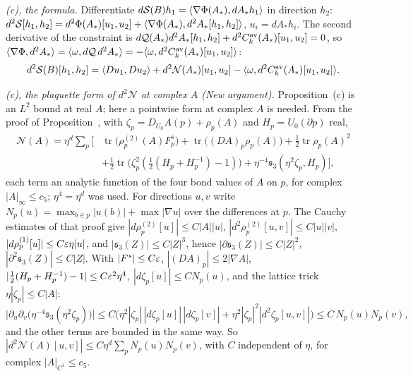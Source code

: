 \begin{detail}
\begin{step}
\end{step}
\begin{step}
\emph{(c), the formula.} Differentiate $d\mathcal S(B)h_1=\langle \nabla\Phi(A_*),dA_*h_1\rangle$ in direction $h_2$: $d^2\mathcal S[h_1,h_2]=d^2\Phi(A_*)[u_1,u_2]+\langle \nabla\Phi(A_*),d^2A_*[h_1,h_2]\rangle$, $u_i=dA_*h_i$. The second derivative of the constraint is $d\mathcal Q(A_*)d^2A_*[h_1,h_2]+d^2C^{\rm av}_k(A_*)[u_1,u_2]=0$, so $\langle \nabla\Phi,d^2A_*\rangle=\langle \omega,d\mathcal Q\,d^2A_*\rangle=-\langle \omega,d^2C^{\rm av}_k(A_*)[u_1,u_2]\rangle$:
\[
d^2\mathcal S(B)[h_1,h_2]=\langle Du_1,Du_2\rangle+d^2\mathcal N(A_*)[u_1,u_2]-\langle \omega,d^2C^{\rm av}_k(A_*)[u_1,u_2]\rangle .
\]
\end{step}
\begin{step}
\emph{(c), the plaquette form of $d^2\mathcal N$ at complex $A$ (New argument).} Proposition~(c) is an $L^2$ bound at real $A$; here a pointwise form at complex $A$ is needed. From the proof of Proposition~, with $\zeta_p=D_{U_0}A(p)+\rho_p(A)$ and $H_p=U_0(\partial p)$ real,
\[
\begin{aligned}
\mathcal N(A)=\eta^d\sum_p\Big[&\operatorname{tr}\big(\rho^{(2)}_p(A)F^s_p\big)+\operatorname{tr}\big((DA)_p\rho_p(A)\big)+\tfrac12\operatorname{tr}\rho_p(A)^2\\
&+\tfrac12\operatorname{tr}\big(\zeta_p^2(\tfrac12(H_p+H_p^{-1})-1)\big)+\eta^{-4}\mathfrak s_3(\eta^2\zeta_p,H_p)\Big],
\end{aligned}
\]
each term an analytic function of the four bond values of $A$ on $p$, for complex $|A|_\infty\le c_5$; $\eta^4=\eta^d$ was used. For directions $u,v$ write $N_p(u)=\max_{b\in p}|u(b)|+\max|\nabla u|$ over the differences at $p$. The Cauchy estimates of that proof give $|d\rho^{(2)}_p[u]|\le C|A||u|$, $|d^2\rho^{(2)}_p[u,v]|\le C|u||v|$, $|d\rho^{(1)}_p[u]|\le C\varepsilon\eta|u|$, and $|\mathfrak s_3(Z)|\le C|Z|^3$, hence $|\partial\mathfrak s_3(Z)|\le C|Z|^2$, $|\partial^2\mathfrak s_3(Z)|\le C|Z|$. With $|F^s|\le C\varepsilon$, $|(DA)_p|\le2|\nabla A|$, $|\tfrac12(H_p+H_p^{-1})-1|\le C\varepsilon^2\eta^4$, $|d\zeta_p[u]|\le CN_p(u)$, and the lattice trick $\eta|\zeta_p|\le C|A|$:
\[
\big|\partial_u\partial_v\big(\eta^{-4}\mathfrak s_3(\eta^2\zeta_p)\big)\big|\le C\big(\eta^2|\zeta_p|\,|d\zeta_p[u]|\,|d\zeta_p[v]|+\eta^2|\zeta_p|^2|d^2\zeta_p[u,v]|\big)\le C\,N_p(u)N_p(v),
\]
and the other terms are bounded in the same way. So $|d^2\mathcal N(A)[u,v]|\le C\eta^d\sum_pN_p(u)N_p(v)$, with $C$ independent of $\eta$, for complex $|A|_{C^1}\le c_5$.
\end{step}
\begin{step}

\end{step}
\end{detail}
